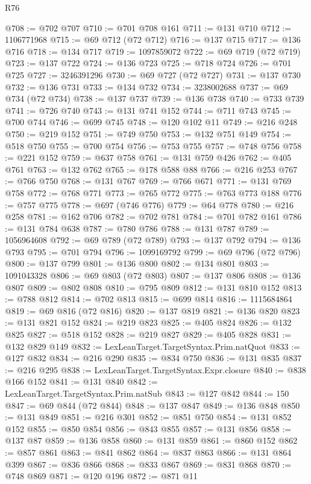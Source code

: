 \begin{lexlean}{R76}
\begin{coremodule}
@708 := @702 @707
@710 := @701 @708 @161
@711 := @131 @710
@712 := 1106771968
@715 := @69 @712 (@72 @712)
@716 := @137 @715
@717 := @136 @716
@718 := @134 @717
@719 := 1097859072
@722 := @69 @719 (@72 @719)
@723 := @137 @722
@724 := @136 @723
@725 := @718 @724
@726 := @701 @725
@727 := 3246391296
@730 := @69 @727 (@72 @727)
@731 := @137 @730
@732 := @136 @731
@733 := @134 @732
@734 := 3238002688
@737 := @69 @734 (@72 @734)
@738 := @137 @737
@739 := @136 @738
@740 := @733 @739
@741 := @726 @740
@743 := @131 @741 @152
@744 := @711 @743
@745 := @700 @744
@746 := @699 @745
@748 := @120 @102 @11
@749 := @216 @248
@750 := @219 @152
@751 := @749 @750
@753 := @132 @751 @149
@754 := @518 @750
@755 := @700 @754
@756 := @753 @755
@757 := @748 @756
@758 := @221 @152
@759 := @637 @758
@761 := @131 @759 @426
@762 := @405 @761
@763 := @132 @762
@765 := @178 @588 @88
@766 := @216 @253
@767 := @766 @750
@768 := @131 @767
@769 := @766 @671
@771 := @131 @769 @758
@772 := @768 @771
@773 := @765 @772
@775 := @763 @773 @188
@776 := @757 @775
@778 := @697 (@746 @776)
@779 := @64 @778
@780 := @216 @258
@781 := @162 @706
@782 := @702 @781
@784 := @701 @782 @161
@786 := @131 @784 @638
@787 := @780 @786
@788 := @131 @787
@789 := 1056964608
@792 := @69 @789 (@72 @789)
@793 := @137 @792
@794 := @136 @793
@795 := @701 @794
@796 := 1099169792
@799 := @69 @796 (@72 @796)
@800 := @137 @799
@801 := @136 @800
@802 := @134 @801
@803 := 1091043328
@806 := @69 @803 (@72 @803)
@807 := @137 @806
@808 := @136 @807
@809 := @802 @808
@810 := @795 @809
@812 := @131 @810 @152
@813 := @788 @812
@814 := @702 @813
@815 := @699 @814
@816 := 1115684864
@819 := @69 @816 (@72 @816)
@820 := @137 @819
@821 := @136 @820
@823 := @131 @821 @152
@824 := @219 @823
@825 := @405 @824
@826 := @132 @825
@827 := @518 @152
@828 := @219 @827
@829 := @405 @828
@831 := @132 @829 @149
@832 := LexLeanTarget.TargetSyntax.Prim.natQuot
@833 := @127 @832
@834 := @216 @290
@835 := @834 @750
@836 := @131 @835
@837 := @216 @295
@838 := LexLeanTarget.TargetSyntax.Expr.closure
@840 := @838 @166 @152
@841 := @131 @840
@842 := LexLeanTarget.TargetSyntax.Prim.natSub
@843 := @127 @842
@844 := 150
@847 := @69 @844 (@72 @844)
@848 := @137 @847
@849 := @136 @848
@850 := @131 @849
@851 := @216 @301
@852 := @851 @750
@854 := @131 @852 @152
@855 := @850 @854
@856 := @843 @855
@857 := @131 @856
@858 := @137 @87
@859 := @136 @858
@860 := @131 @859
@861 := @860 @152
@862 := @857 @861
@863 := @841 @862
@864 := @837 @863
@866 := @131 @864 @399
@867 := @836 @866
@868 := @833 @867
@869 := @831 @868
@870 := @748 @869
@871 := @120 @196
@872 := @871 @11

\end{coremodule}
\end{lexlean}
